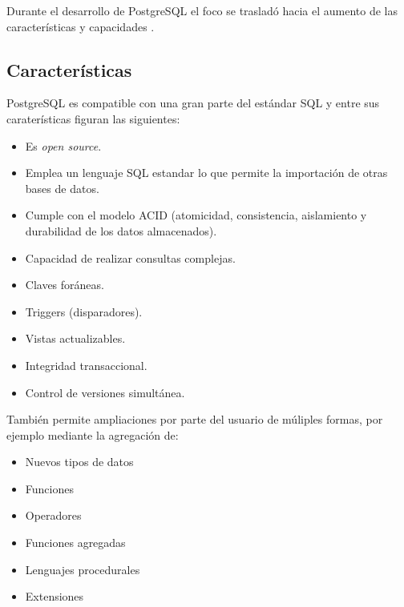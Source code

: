 Durante el desarrollo de PostgreSQL el foco se trasladó hacia el aumento de las características y capacidades .

\subsection{Características}
\label{sec:caracteristicas}

PostgreSQL es compatible con una gran parte del estándar SQL y entre sus caraterísticas figuran las siguientes: 
\begin{itemize}
\item Es \textit{open source}.
\item Emplea un lenguaje SQL estandar lo que permite la importación de otras bases de datos.
\item Cumple con el modelo ACID (atomicidad, consistencia, aislamiento y durabilidad de los datos almacenados).
\item Capacidad de realizar consultas complejas.
\item Claves foráneas.
\item Triggers (disparadores).
\item Vistas actualizables.
\item Integridad transaccional.
\item Control de versiones simultánea.
\end{itemize}

También permite ampliaciones por parte del usuario de múliples formas, por ejemplo mediante la agregación de:
\begin{itemize}
\item Nuevos tipos de datos 
\item Funciones 
\item Operadores 
\item Funciones agregadas 
\item Lenguajes procedurales 
\item Extensiones
\end{itemize}


